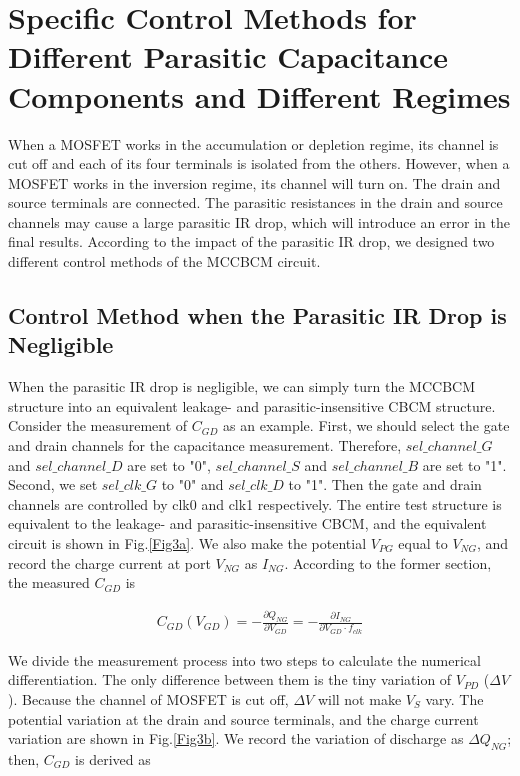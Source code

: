 \documentclass[journal]{IEEEtran}
\begin{document}
\section{Specific Control Methods for Different Parasitic Capacitance Components and Different Regimes}

When a MOSFET works in the accumulation or depletion regime, its channel is cut off and each of its four terminals is isolated from the others. However, when a MOSFET works in the inversion regime, its channel will turn on. The drain and source terminals are connected. The parasitic resistances in the drain and source channels may cause a large parasitic IR drop, which will introduce an error in the final results. According to the impact of the parasitic IR drop, we designed two different control methods of the MCCBCM circuit.



\subsection{Control Method when the Parasitic IR Drop is Negligible}

When the parasitic IR drop is negligible, we can simply turn the MCCBCM structure into an equivalent leakage- and parasitic-insensitive CBCM structure. Consider the measurement of $C_{GD}$ as an example. First, we should select the gate and drain channels for the capacitance measurement. Therefore, $sel\_channel\_G$ and $sel\_channel\_D$ are set to "0", $sel\_channel\_S$ and $sel\_channel\_B$ are set to "1". Second, we set $sel\_clk\_G$ to "0" and $sel\_clk\_D$ to "1". Then the gate and drain channels are controlled by clk0 and clk1 respectively. The entire test structure is equivalent to the leakage- and parasitic-insensitive CBCM, and the equivalent circuit is shown in Fig.\ref{Fig3a}. We also make the potential $V_{PG}$ equal to $V_{NG}$, and record the charge current at port $V_{NG}$ as $I_{NG}$. According to the former section, the measured $C_{GD}$ is 

\begin{align}
  C_{GD}(V_{GD})=-\frac{\partial Q_{NG}}{\partial V_{GD}}=-\frac{\partial I_{NG}}{\partial V_{GD}\cdot f_{clk}}
\end{align}

We divide the measurement process into two steps to calculate the numerical differentiation. The only difference between them is the tiny variation of $V_{PD}$ ($\Delta V$). Because the channel of MOSFET is cut off, $\Delta V$ will not make $V_{S}$ vary. The potential variation at the drain and source terminals, and the charge current variation are shown in Fig.\ref{Fig3b}. We record the variation of discharge as $\Delta Q_{NG}$; then, $C_{GD}$ is derived as 
\end{document}
